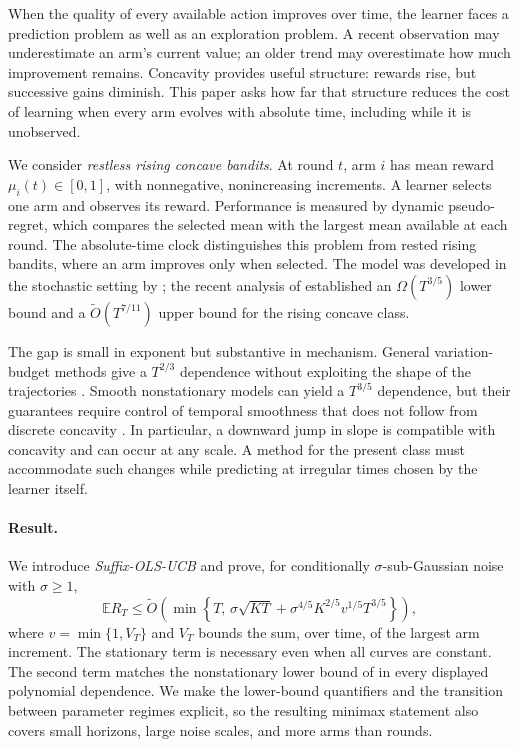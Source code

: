 \documentclass[11pt]{article}
\theoremstyle{remark}
\newcommand{\E}{\mathbb E}
\begin{document}
When the quality of every available action improves over time, the learner faces a prediction problem as well as an exploration problem. A recent observation may underestimate an arm's current value; an older trend may overestimate how much improvement remains. Concavity provides useful structure: rewards rise, but successive gains diminish. This paper asks how far that structure reduces the cost of learning when every arm evolves with absolute time, including while it is unobserved.

We consider \emph{restless rising concave bandits}. At round $t$, arm $i$ has mean reward $\mu_i(t)\in[0,1]$, with nonnegative, nonincreasing increments. A learner selects one arm and observes its reward. Performance is measured by dynamic pseudo-regret, which compares the selected mean with the largest mean available at each round. The absolute-time clock distinguishes this problem from rested rising bandits, where an arm improves only when selected. The model was developed in the stochastic setting by \citet{metelli2022stochastic}; the recent analysis of \citet{migali2025tightening} established an $\Omega(T^{3/5})$ lower bound and a $\widetilde O(T^{7/11})$ upper bound for the rising concave class.

The gap is small in exponent but substantive in mechanism. General variation-budget methods give a $T^{2/3}$ dependence without exploiting the shape of the trajectories \citep{besbes2014nonstationary}. Smooth nonstationary models can yield a $T^{3/5}$ dependence, but their guarantees require control of temporal smoothness that does not follow from discrete concavity \citep{jia2023smooth,suk2025adaptive}. In particular, a downward jump in slope is compatible with concavity and can occur at any scale. A method for the present class must accommodate such changes while predicting at irregular times chosen by the learner itself.

\paragraph{Result.}
We introduce \emph{Suffix-OLS-UCB} and prove, for conditionally $\sigma$-sub-Gaussian noise with $\sigma\ge1$,
\begin{equation}\label{eq:intro-rate}
\E R_T\le\widetilde O\!\left(\min\left\{T,\,
\sigma\sqrt{KT}+\sigma^{4/5}K^{2/5}v^{1/5}T^{3/5}\right\}\right),
\end{equation}
where $v=\min\{1,V_T\}$ and $V_T$ bounds the sum, over time, of the largest arm increment. The stationary term is necessary even when all curves are constant. The second term matches the nonstationary lower bound of \citet{migali2025tightening} in every displayed polynomial dependence. We make the lower-bound quantifiers and the transition between parameter regimes explicit, so the resulting minimax statement also covers small horizons, large noise scales, and more arms than rounds.
\end{document}
